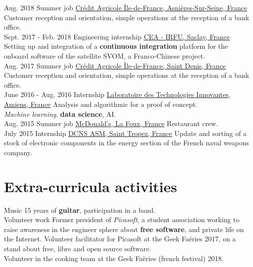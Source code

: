 \documentclass[a4paper]{twentysecondcv} %
\begin{document}
\begin{twenty} %
    \twentyitem
    	{Aug. 2018}
		{}
        {Summer job}
        {\href{https://ca-paris.com/}{Crédit Agricole Île-de-France, Asnières-Sur-Seine, France}}
        {}
        {Customer reception and orientation, simple operations at the reception of a bank office.}
    \\
    \twentyitem
    	{Sept. 2017 -}
		{Feb. 2018}
        {Engineering internship}
        {\href{http://irfu.cea.fr/}{CEA - IRFU, Saclay, France}}
        {}
        {Setting up and integration of a \textbf{continuous integration} platform for the onboard software of the satellite SVOM, a Franco-Chinese project.}
    \\
    \twentyitem
    	{Aug. 2017}
		{}
        {Summer job}
        {\href{https://ca-paris.com/}{Crédit Agricole Île-de-France, Saint Denis, France}}
        {}
        {Customer reception and orientation, simple operations at the reception of a bank office.}
    \\
	\twentyitem
    	{June 2016 -}
		{Aug. 2016}
        {Internship}
        {\href{http://lti-picardie.fr/}{Laboratoire des Technologies Innovantes, Amiens, France}}
        {}
        {Analysis and algorithmic for a proof of concept.\\\textit{Machine learning}, \textbf{data science}, AI.}
    \\   
    \twentyitem
   		{Aug. 2015}
        {}
        {Summer job}
        {\href{https://www.restaurants.mcdonalds.fr/mcdonalds-gassin}{McDonald's, La Foux, France}}
        {}
        {Restaurant crew.}
     \\
     \twentyitem
   		{July 2015}
		{}
        {Internship}
        {\href{https://www.naval-group.com/fr/}{DCNS ASM, Saint Tropez, France}}
        {}
        {Update and sorting of a stock of electronic components in the energy section of the French naval weapons company.}
        
\end{twenty}


\section{Extra-curricula activities}
\begin{twenty}
	\twentyitem
    	{}
		{}
        {Music}
        {}
        {}
        {15 years of \textbf{guitar}, participation in a band.}
    \\
    \twentyitem
    	{}
		{}
        {Volunteer work}
        {}
        {}
        {Former president of \textit{Picasoft}, a student association working to raise awareness in the engineer sphere about \textbf{free software}, and private life on the Internet. Volunteer facilitator for Picasoft at the Geek Faëries 2017, on a stand about free, libre and open source software.\\Volunteer in the cooking team at the Geek Faëries (french festival) 2018.}
\end{twenty}
\end{document}

